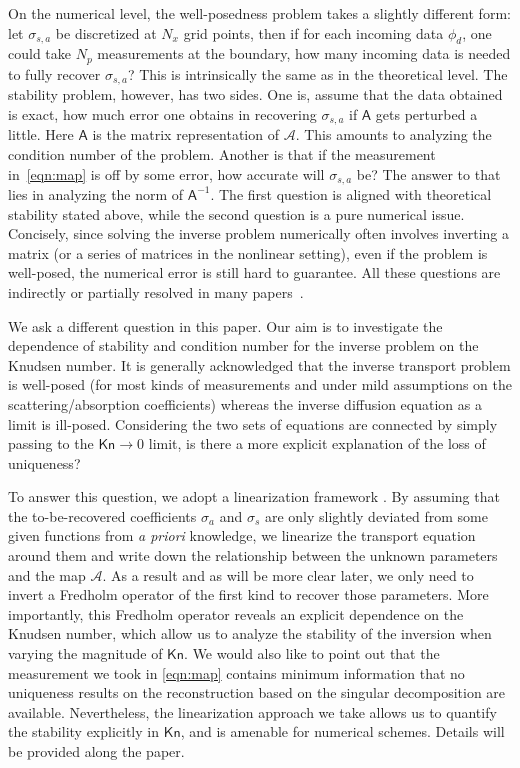 \documentclass[english,reqno]{amsart}
\theoremstyle{plain}
\theoremstyle{definition} %
\newcommand{\Amat}{\mathsf{A}}
\newcommand{\Kn}{\mathsf{Kn}}
\begin{document}
On the numerical level, the well-posedness problem takes a slightly different form: let $\sigma_{s,a}$ be discretized at $N_x$ grid points, then if for each incoming data $\phi_d$, one could take $N_p$ measurements at the boundary, how many incoming data is needed to fully recover $\sigma_{s,a}$? This is intrinsically the same as in the theoretical level. The stability problem, however, has two sides. One is, assume that the data obtained is exact, how much error one obtains in recovering $\sigma_{s,a}$ if $\Amat$ gets perturbed a little. Here $\Amat$ is the matrix representation of $\mathcal{A}$. This amounts to analyzing the condition number of the problem. Another is that if the measurement in~\eqref{eqn:map} is off by some error, how accurate will $\sigma_{s,a}$ be? The answer to that lies in analyzing the norm of $\Amat^{-1}$. The first question is aligned with theoretical stability stated above, while the second question is a pure numerical issue. Concisely, since solving the inverse problem numerically often involves inverting a matrix (or a series of matrices in the nonlinear setting), even if the problem is well-posed, the numerical error is still hard to guarantee. All these questions are indirectly or partially resolved in many papers~\cite{Arridge99, Ren_review}.


We ask a different question in this paper. Our aim is to investigate the dependence of stability and condition number for the inverse problem on the Knudsen number. It is generally acknowledged that the inverse transport problem is well-posed (for most kinds of measurements and under mild assumptions on the scattering/absorption coefficients) whereas the inverse diffusion equation as a limit is ill-posed. Considering the two sets of equations are connected by simply passing to the $\Kn\to 0$ limit, is there a more explicit explanation of the loss of uniqueness? 

To answer this question, we adopt a linearization framework \cite{Ren_review}. By assuming that the to-be-recovered coefficients $\sigma_a$ and $\sigma_s$ are only slightly deviated from some given functions from {\it a priori} knowledge, we linearize the transport equation around them and write down the relationship between the unknown parameters and the map $\mathcal{A}$. As a result and as will be more clear later, we only need to invert a Fredholm operator of the first kind to recover those parameters. More importantly, this Fredholm operator reveals an explicit dependence on the Knudsen number, which allow us to analyze the stability of the inversion when varying the magnitude of $\Kn$. We would also like to point out that the measurement we took in \eqref{eqn:map} contains minimum information that no uniqueness results on the reconstruction based on the singular decomposition are available. Nevertheless, the linearization approach we take allows us to quantify the stability explicitly in $\Kn$, and is amenable for numerical schemes. Details will be provided along the paper. 
\end{document}
